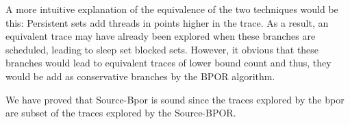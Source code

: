 A more intuitive explanation of the equivalence of the two techniques would be this: Persistent sets add threads in points higher in the trace. As a result, an equivalent trace
may have already been explored when these branches are scheduled, leading to sleep set blocked sets. However, it obvious that these branches would lead to equivalent traces of
lower bound count and thus, they would be add as conservative branches by the BPOR algorithm.

We have proved that Source-Bpor is sound since the traces explored by the bpor are subset of the traces explored by the Source-BPOR.
